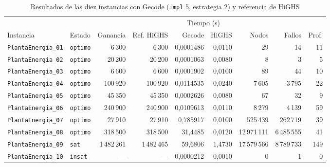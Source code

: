 \begin{table}[htbp]
    \caption{Resultados de las diez instancias con Gecode (\texttt{impl} 5, estrategia 2) y referencia de HiGHS}
    \label{tab:plantas-resultados}
    \footnotesize
    \setlength{\tabcolsep}{3.5pt}
    \begin{tabular}{@{}llrrrrrrr@{}}
        \toprule
        & & & & \multicolumn{2}{c}{Tiempo (s)} & & & \\
        \cmidrule(lr){5-6}
        Instancia & Estado & Ganancia & Ref. HiGHS & Gecode & HiGHS & Nodos & Fallos & Prof. \\
        \midrule
        \texttt{PlantaEnergia\_01} & \texttt{optimo} & 6\,300       & 6\,300       & 0,0001486 & 0,0110 & 29          & 14         & 11  \\
        \texttt{PlantaEnergia\_02} & \texttt{optimo} & 20\,200      & 20\,200      & 0,0001063 & 0,0080 & 8           & 3          & 5   \\
        \texttt{PlantaEnergia\_03} & \texttt{optimo} & 6\,600       & 6\,600       & 0,0001902 & 0,0100 & 89          & 44         & 10  \\
        \texttt{PlantaEnergia\_04} & \texttt{optimo} & 100\,920     & 100\,920     & 0,0114535 & 0,0240 & 7\,605      & 3\,795     & 22  \\
        \texttt{PlantaEnergia\_05} & \texttt{optimo} & 45\,350      & 45\,350      & 0,0002626 & 0,0080 & 67          & 32         & 9   \\
        \texttt{PlantaEnergia\_06} & \texttt{optimo} & 240\,900     & 240\,900     & 0,0109613 & 0,0110 & 8\,279      & 4\,139     & 59  \\
        \texttt{PlantaEnergia\_07} & \texttt{optimo} & 27\,910      & 27\,910      & 0,785917  & 0,0100 & 525\,439    & 262\,719   & 39  \\
        \texttt{PlantaEnergia\_08} & \texttt{optimo} & 318\,500     & 318\,500     & 31,4485   & 0,0120 & 12\,971\,111 & 6\,485\,555 & 41  \\
        \texttt{PlantaEnergia\_09} & \texttt{sat}    & 1\,482\,261  & 1\,482\,465  & 59,6806   & 1,4730 & 17\,579\,566 & 8\,789\,733 & 149 \\
        \texttt{PlantaEnergia\_10} & \texttt{insat}  & ---          & ---          & 0,0000212 & 0,0010 & 0 & 1 & 0 \\
        \bottomrule
    \end{tabular}
\end{table}


